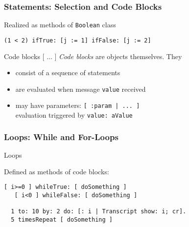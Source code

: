 \documentclass{beamer}
\newcommand{\Blue}[1]{\color{blue}#1\color{black}}
\begin{document}

\begin{frame}[fragile]
\frametitle{Statements: Selection and Code Blocks}

Realized as methods of \texttt{Boolean} class

\begin{lstlisting}[language=Smalltalk]
  (1 < 2) ifTrue: [j := 1] ifFalse: [j := 2]
\end{lstlisting} 

\pause\medskip

\begin{block}{Code blocks [ ... ]}
\emph{Code blocks} are objects themselves. They
\begin{itemize}
  \item consist of a sequence of statements
  \item are evaluated when message \texttt{value} received
  \item may have parameters: 
    \lstinline[language=Smalltalk]{[ :param | ... ]} \\
    evaluation triggered by \texttt{value: aValue}
\end{itemize}

\end{block}


\end{frame}


\begin{frame}[fragile]
\frametitle{Loops: While and For-Loops}

\Blue{Loops}\medskip

Defined as methods of code blocks:

\begin{lstlisting}[language=Smalltalk]
   [ i>=0 ] whileTrue: [ doSomething ]
   [ i<0 ] whileFalse: [ doSomething ]

  1 to: 10 by: 2 do: [: i | Transcript show: i; cr].
  5 timesRepeat [ doSomething ]   
\end{lstlisting} 

\end{frame}

\end{document}
